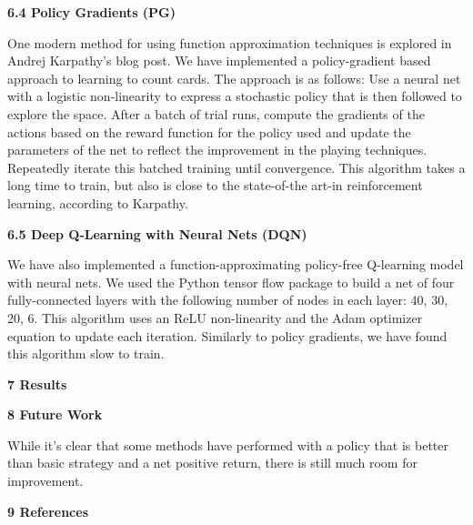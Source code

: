\documentclass[12pt]{article}
\begin{document}
    \textbf{6.4 Policy Gradients (PG)} \newline 
    
    One modern method for using function approximation techniques is explored in Andrej Karpathy's blog post. We have implemented a policy-gradient based approach to learning to count cards. The approach is as follows: Use a neural net with a logistic non-linearity to express a stochastic policy that is then followed to explore the space. After a batch of trial runs, compute the gradients of the actions based on the reward function for the policy used and update the parameters of the net to reflect the improvement in the playing techniques. Repeatedly iterate this batched training until convergence. This algorithm takes a long time to train, but also is close to the state-of-the art-in reinforcement learning, according to Karpathy. \newline
    
    \textbf{6.5 Deep Q-Learning with Neural Nets (DQN)} \newline
    
    We have also implemented a function-approximating policy-free Q-learning model with neural nets. We used the Python tensor flow package to build a net of four fully-connected layers with the following number of nodes in each layer: 40, 30, 20, 6. This algorithm uses an ReLU non-linearity and the Adam optimizer equation to update each iteration. Similarly to policy gradients, we have found this algorithm slow to train. \newline 
    
    {\large \textbf{7 Results}} \newline
    
    {\large \textbf{8 Future Work}} \newline
    
    While it's clear that some methods have performed with a policy that is better than basic strategy and a net positive return, there is still much room for improvement. 
    
    {\large \textbf{9 References}} \newline
\end{document}
